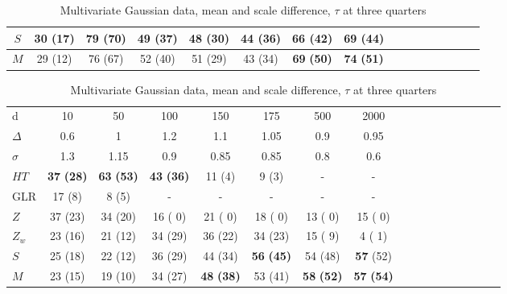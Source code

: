 \documentclass[arxiv, preprint]{imsart}
\numberwithin{equation}{section}
\theoremstyle{plain}
\begin{document}
\begin{table}[!htp]
\begin{tabular}{c|ccccccccccccccc}
\hline
$S$ & 30 (17)& \textbf{79} \textbf{(70)} &  49 (37)& \textbf{48} (30)& \textbf{44} \textbf{(36)}& 66 (42) &  69 (44) \\
\hline
$M$ & 29 (12)& 76 (67)& 52 (40) & 51 (29)& 43 (34)& \textbf{69} \textbf{(50)}& \textbf{74} \textbf{(51)} \\
\hline \hline
\end{tabular}
\label{table:ls_100} 
\vspace{2mm}
\caption{Multivariate Gaussian data, mean and scale difference, $\tau$ at three quarters }
\begin{tabular}{p{1cm}|cccccccccccccccc}
\hline
\hline
  d      & 10  & 50    & 100 & 150  & 175  &  500 &  2000\\
$\Delta$ & 0.6 & 1     & 1.2 & 1.1  & 1.05 & 0.9  & 0.95 \\
$\sigma$ & 1.3 & 1.15  & 0.9 & 0.85 & 0.85 & 0.8  & 0.6 \\
\hline
\hline
$HT$ & \textbf{37} \textbf{(28)}& \textbf{63} \textbf{(53)}& \textbf{43} \textbf{(36)}& 11 (4)&  9 (3)& - & -  \\
\hline
GLR & 17 (8) &  8 (5)&  - &  - & - & - & - \\
\hline
$Z$ & 37 (23)&   34 (20)  &  16 ( 0)&  21 ( 0) &  18 ( 0)& 13 ( 0) &  15 ( 0)\\
\hline
$Z_w$ & 23 (16)&   21 (12)&  34 (29)&  36 (22)&  34 (23)& 15 ( 9) &  4 ( 1)\\
\hline
$S$ & 25 (18)&  22 (12)&   36 (29)&  44 (34)&  \textbf{56} \textbf{(45)} & 54 (48)&\textbf{57} (52)\\
\hline
$M$  & 23  (15)  &  19 (10) & 34 (27)& \textbf{48} \textbf{(38)} & 53 (41)&  \textbf{58} \textbf{(52)}&  \textbf{57} \textbf{(54)}\\
 \hline \hline
\end{tabular}
\label{table:ls_150} 
\end{table}
\end{document}
